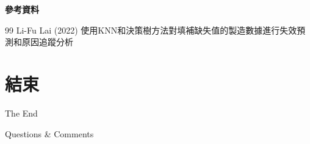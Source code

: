 \documentclass[12pt,aspectratio=43]{beamer}
\begin{document}
\begin{frame}{\textbf{參考資料}}
\linespread{1.5}

\footnotesize

  \begin{thebibliography}{99} 
      Li-Fu Lai (2022) %
      \newblock 使用KNN和決策樹方法對填補缺失值的製造數據進行失效預測和原因追蹤分析 %
  \end{thebibliography}
\end{frame}

\section*{結束}

\begin{frame}[plain] %
	\begin{center}
		{\Huge The End}
		\bigskip\bigskip 

		{\LARGE Questions  \&  Comments}
	\end{center}
\end{frame}
\end{document}
